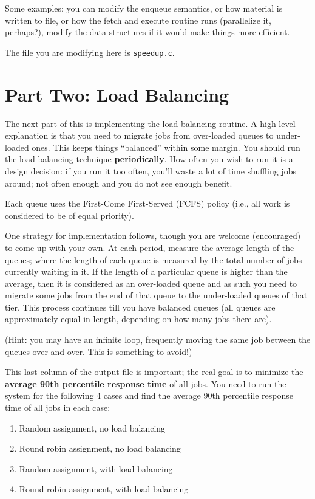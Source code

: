 \documentclass[letterpaper,10pt]{article}
\begin{document}
Some examples: you can modify the enqueue semantics, or how material is written to file, or how the fetch and execute routine runs (parallelize it, perhaps?), modify the data structures if it would make things more efficient.

The file you are modifying here is \texttt{speedup.c}.


\section*{Part Two: Load Balancing}
The next part of this is implementing the load balancing routine. A high level explanation is that you need to migrate jobs from over-loaded queues to under-loaded ones. This keeps things ``balanced'' within some margin. You should run the load balancing technique \textbf{periodically}. How often you wish to run it is a design decision: if you run it too often, you'll waste a lot of time shuffling jobs around; not often enough and you do not see enough benefit.

Each queue uses the First-Come First-Served (FCFS) policy (i.e., all work is considered to be of equal priority).

One strategy for implementation follows, though you are welcome (encouraged) to come up with your own. At each period, measure the average length of the queues; where the length of each queue is measured by the total number of jobs currently waiting in it. If the length of a particular queue is higher than the average, then it is considered as an over-loaded queue and as such you need to migrate some jobs from the end of that queue to the under-loaded queues of that tier. This process continues till you have balanced queues (all queues are approximately equal in length, depending on how many jobs there are).

(Hint: you may have an infinite loop, frequently moving the same job between the queues over and over. This is something to avoid!)

This last column of the output file is important; the real goal is to minimize the \textbf{average 90th percentile response time} of all jobs. You need to run the system for the following 4 cases and find the average 90th percentile response time of all jobs in each case:

\begin{enumerate}
	\item Random assignment, no load balancing
	\item Round robin assignment, no load balancing
	\item Random assignment, with load balancing
	\item Round robin assignment, with load balancing
\end{enumerate}
\end{document}

